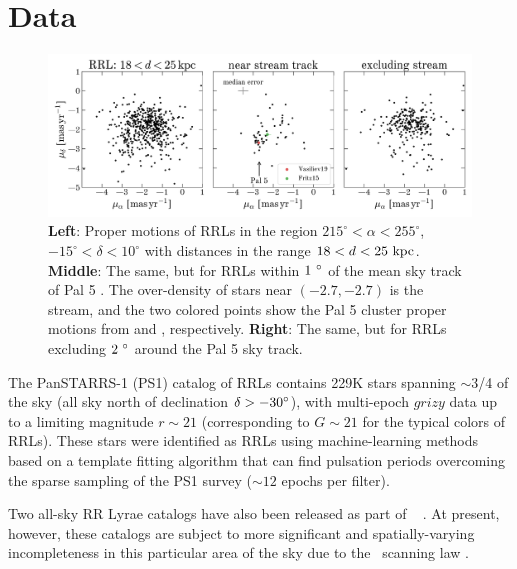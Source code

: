 \documentclass[twocolumn]{aastex63}
\begin{document}
\section{Data} \label{sec:data}

\begin{figure}[t!]
\begin{center}
\includegraphics[width=\textwidth]{proper-motion.pdf}
\caption{\textbf{Left}: Proper motions of RRLs in the region $215^\circ < \alpha < 255^\circ$, $-15^\circ < \delta < 10^\circ$ with distances in the range $18 < d < 25~\mathrm{kpc}$.
\textbf{Middle}: The same, but for RRLs within $1~\mbox{$^\circ$}$ of the mean sky track of Pal 5 \citep{Bonaca:2019}.
The over-density of stars near $(-2.7, -2.7)$ is the stream, and the two colored points show the Pal 5 cluster proper motions from \citet{Vasiliev:2019} and \citet{Fritz:2015}, respectively.
\textbf{Right}: The same, but for RRLs excluding $2~\mbox{$^\circ$}$ around the Pal 5 sky track.}
\label{fig:pm}
\end{center}
\end{figure}


The PanSTARRS-1 (PS1) catalog of RRLs \citep{Sesar:2017b} contains 229K stars spanning $\sim$3/4 of the sky (all sky north of declination $\delta > -30\mbox{$^\circ$}$), with multi-epoch $grizy$ data up to a limiting magnitude $r\sim21$ (corresponding to $G \sim 21$ for the typical colors of RRLs). These stars were identified as RRLs using machine-learning methods based on a template fitting algorithm that can find pulsation periods overcoming the sparse sampling of the PS1 survey ($\sim12$ epochs per filter).  

Two all-sky RR Lyrae catalogs have also been released as part of \Gaia~ \citep[VariClassifier and Specific Object Studies][]{Holl2018, Rimoldini2018, Clementini2018}. At present, however, these catalogs are subject to more significant and spatially-varying incompleteness in this particular area of the sky due to the \Gaia\ scanning law \citep[see][]{Rimoldini2018}.
\end{document}
